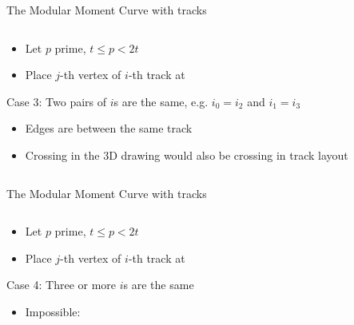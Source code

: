 \documentclass[t]{beamer}
\begin{document}
\begin{frame}{The Modular Moment Curve with tracks}
    \vspace{-0.5cm}
    \begin{columns}
	\begin{column}{0.5\textwidth}
		\begin{itemize}
		    \item <+-> Let $p$ prime, $t\le p<2t$
		    \item
			Place $j$-th vertex of $i$-th track at  \\
			\end{itemize}
			Case 3: Two pairs of $i$s are the same, e.g. $i_0 = i_2$ and $i_1 = i_3$
			\begin{itemize}
			    \item<+-> Edges are between the same track
			    \item<+-> Crossing in the 3D drawing would also be crossing in track layout
		\end{itemize}
	\end{column}
	    \begin{column}{0.5\textwidth}
		\begin{center}
		\end{center}
	    \end{column}
    \end{columns}
\end{frame}

\begin{frame}{The Modular Moment Curve with tracks}
    \vspace{-0.5cm}
    \begin{columns}
	\begin{column}{0.5\textwidth}
		\begin{itemize}
		    \item <+-> Let $p$ prime, $t\le p<2t$
		    \item
			Place $j$-th vertex of $i$-th track at  \\
			\end{itemize}
			Case 4: Three or more $i$s are the same
			\begin{itemize}
			    \item<+-> Impossible: 
			\end{itemize}
	\end{column}
	    \begin{column}{0.5\textwidth}
		\begin{center}
		\end{center}
	    \end{column}
    \end{columns}
\end{frame}
\end{document}
